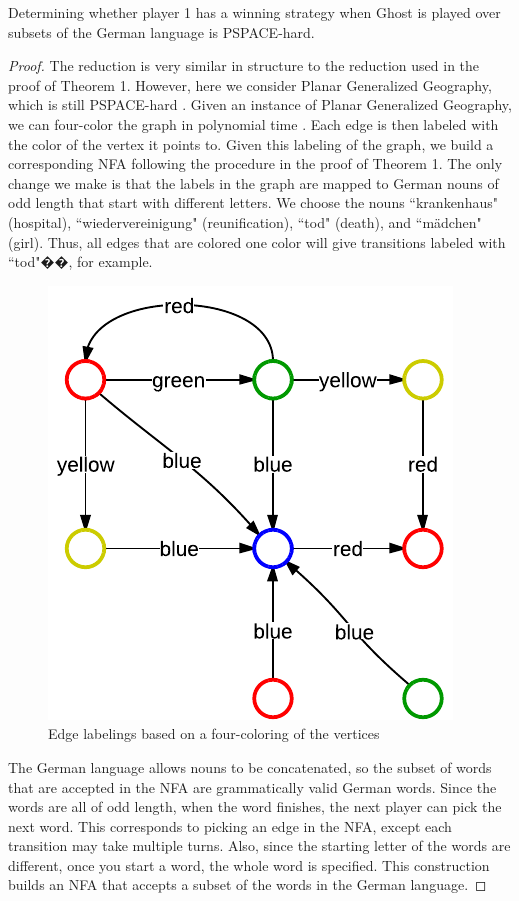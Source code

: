 \documentclass[runningheads,a4paper]{llncs}
\begin{document}
\begin{theorem}Determining whether player 1 has a winning strategy when Ghost is played over subsets of the German language is PSPACE-hard.
\end{theorem}

\begin{proof} The reduction is very similar in structure to the reduction used in the proof of Theorem 1. However, here we consider Planar Generalized Geography, which is still PSPACE-hard \cite{Sipser}. Given an instance of Planar Generalized Geography, we can four-color the graph in polynomial time \cite{planargraph}. Each edge is then labeled with the color of the vertex it points to. Given this labeling of the graph, we build a corresponding NFA following the procedure in the proof of Theorem 1. The only change we make is that the labels in the graph are mapped to German nouns of odd length that start with different letters. We choose the nouns ``krankenhaus" (hospital), ``wiedervereinigung" (reunification), ``tod" (death), and ``m{\"a}dchen" (girl). Thus, all edges that are colored one color will give transitions labeled with ``tod"��, for example. 

\begin{figure}
\centering
\includegraphics[width=0.4\linewidth]{Ghost3.pdf}
\caption{Edge labelings based on a four-coloring of the vertices}
\label{fig:reduction}
\end{figure}

	The German language allows nouns to be concatenated, so the subset of words that are accepted in the NFA are grammatically valid German words. Since the words are all of odd length, when the word finishes, the next player can pick the next word. This corresponds to picking an edge in the NFA, except each transition may take multiple turns. Also, since the starting letter of the words are different, once you start a word, the whole word is specified. This construction builds an NFA that accepts a subset of the words in the German language. 
\end{proof}
\end{document}
